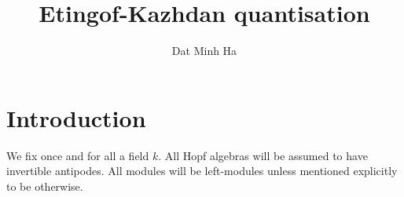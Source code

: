 

\setcounter{section}{-1}





    \title{Etingof-Kazhdan quantisation}
    
    \author{Dat Minh Ha}
    \maketitle
    
    \begin{abstract}
    
    \end{abstract}
    
    {
    \hypersetup{} 
    \tableofcontents %
    }

    \section{Introduction}
        \begin{convention}
            We fix once and for all a field $k$. All Hopf algebras will be assumed to have invertible antipodes. All modules will be left-modules unless mentioned explicitly to be otherwise.
        \end{convention}

    
    
    

    
    
    \printbibliography

